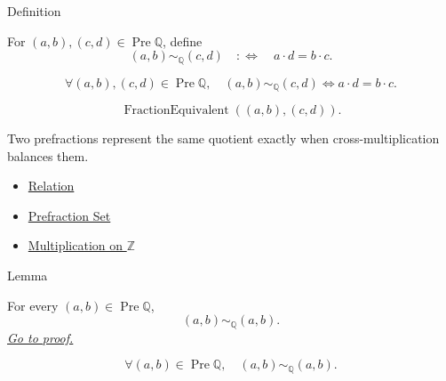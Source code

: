 \begin{definitionbox}{Definition}
\begin{definition}
\label{def:fraction-equivalence}
For $(a,b),(c,d)\in\operatorname{Pre}\mathbb{Q}$, define
\[
(a,b)\sim_{\mathbb{Q}}(c,d)
\quad:\Longleftrightarrow\quad
a\cdot d=b\cdot c.
\]
\end{definition}
\end{definitionbox}

\begin{remark*}
\[
\forall (a,b),(c,d)\in\operatorname{Pre}\mathbb{Q},\quad
(a,b)\sim_{\mathbb{Q}}(c,d)
\Longleftrightarrow
a\cdot d=b\cdot c.
\]
\end{remark*}

\begin{remark*}
\[
\operatorname{FractionEquivalent}((a,b),(c,d)).
\]
\end{remark*}

\begin{remark*}[Interpretation]
Two prefractions represent the same quotient exactly when cross-multiplication
balances them.
\end{remark*}

\begin{dependencies}
\begin{itemize}
  \item \hyperref[def:relation]{Relation}
  \item \hyperref[def:prefraction-set]{Prefraction Set}
  \item \hyperref[def:multiplication-on-z-classes]{Multiplication on $\mathbb{Z}$}
\end{itemize}
\end{dependencies}

\begin{lemmabox}{Lemma}
\begin{lemma}
\label{lem:fraction-equivalence-reflexive}
For every $(a,b)\in\operatorname{Pre}\mathbb{Q}$,
\[
(a,b)\sim_{\mathbb{Q}}(a,b).
\]
\hyperref[prf:fraction-equivalence-reflexive]{\textit{Go to proof.}}
\end{lemma}
\end{lemmabox}

\begin{remark*}
\[
\forall (a,b)\in\operatorname{Pre}\mathbb{Q},\quad
(a,b)\sim_{\mathbb{Q}}(a,b).
\]
\end{remark*}


